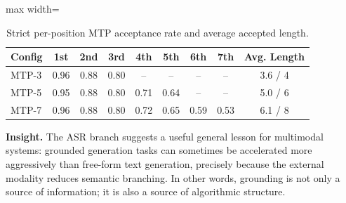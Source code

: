 \begin{table}[htb]
\centering
\small
\setlength{\tabcolsep}{8pt}
\caption{Strict per-position MTP acceptance rate and average accepted length.}
\label{tab:acceptance}
\begin{adjustbox}{max width=\textwidth}
\begin{tabular}{lccccccc|c}
\toprule
Config & 1st & 2nd & 3rd & 4th & 5th & 6th & 7th & Avg. Length \\
\midrule
MTP-3 & 0.96 & 0.88 & 0.80 & -- & -- & -- & -- & 3.6 / 4 \\
MTP-5 & 0.95 & 0.88 & 0.80 & 0.71 & 0.64 & -- & -- & 5.0 / 6 \\
MTP-7 & 0.96 & 0.88 & 0.80 & 0.72 & 0.65 & 0.59 & 0.53 & 6.1 / 8 \\
\bottomrule
\end{tabular}
\end{adjustbox}
\end{table}


\textbf{Insight.} The ASR branch suggests a useful general lesson for multimodal systems: grounded generation tasks can sometimes be accelerated more aggressively than free-form text generation, precisely because the external modality reduces semantic branching. In other words, grounding is not only a source of information; it is also a source of algorithmic structure.
